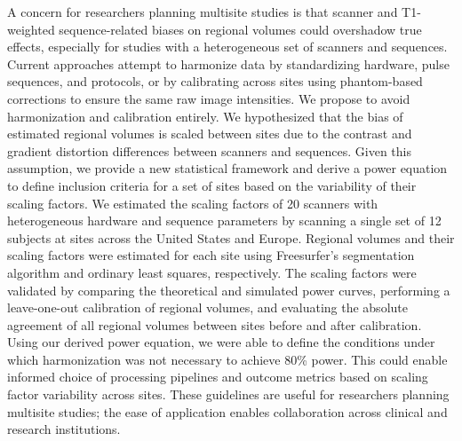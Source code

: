 
A concern for researchers planning multisite studies is that scanner and T1-weighted sequence-related biases on regional volumes could overshadow true effects, especially for studies with a heterogeneous set of scanners and sequences. Current approaches attempt to harmonize data by standardizing hardware, pulse sequences, and protocols, or by calibrating across sites using phantom-based corrections to ensure the same raw image intensities. We propose to avoid harmonization and calibration entirely.  We hypothesized that the bias of estimated regional volumes is scaled between sites due to the contrast and gradient distortion differences between scanners and sequences. Given this assumption, we provide a new statistical framework and derive a power equation to define inclusion criteria for a set of sites based on the variability of their scaling factors. We estimated the scaling factors of 20 scanners with heterogeneous hardware and sequence parameters by scanning a single set of 12 subjects at sites across the United States and Europe. Regional volumes and their scaling factors were estimated for each site using Freesurfer's segmentation algorithm and ordinary least squares, respectively. The scaling factors were validated by comparing the theoretical and simulated power curves, performing a leave-one-out calibration of regional volumes, and evaluating the absolute agreement of all regional volumes between sites before and after calibration. Using our derived power equation, we were able to define the conditions under which harmonization was not necessary to achieve 80\% power. This could enable informed choice of processing pipelines and outcome metrics based on scaling factor variability across sites. These guidelines are useful for researchers planning multisite studies; the ease of application enables collaboration across clinical and research institutions.